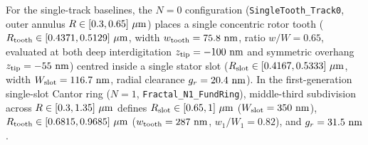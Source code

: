 \documentclass[pdflatex,sn-nature]{sn-jnl}
\begin{document}
For the single-track baselines, the $N=0$ configuration (\texttt{SingleTooth\_Track0}, outer annulus $R \in [0.3{}, 0.65{}]\ \mu\text{m}$) places a single concentric rotor tooth ($R_{\rm tooth} \in [0.4371, 0.5129]\ \mu\text{m}$, width $w_{\rm tooth} = 75.8{}\text{ nm}$, ratio $w/W = 0.65$, evaluated at both deep interdigitation $z_{\rm tip} = -100\text{ nm}$ and symmetric overhang $z_{\rm tip} = -55\text{ nm}$) centred inside a single stator slot ($R_{\rm slot} \in [\SingletoothTrackzeroSlotRInUm{}, \SingletoothTrackzeroSlotROutUm{}]\ \mu\text{m}$, width $W_{\rm slot} = 116.7{}\text{ nm}$, radial clearance $g_r = 20.4{}\text{ nm}$). In the first-generation single-slot Cantor ring ($N=1$, \texttt{Fractal\_N1\_FundRing}), middle-third subdivision across $R \in [0.3{}, 1.35{}]\ \mu\text{m}$ defines $R_{\rm slot} \in [0.65{}, 1{}]\ \mu\text{m}$ ($W_{\rm slot} = 350{}\text{ nm}$), $R_{\rm tooth} \in [0.6815, 0.9685]\ \mu\text{m}$ ($w_{\rm tooth} = 287{}\text{ nm}$, $w_1/W_1 = 0.82$), and $g_r = 31.5{}\text{ nm}$.
\end{document}

